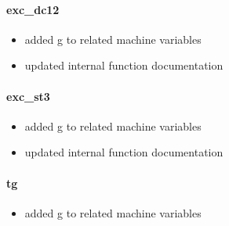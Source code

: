 \documentclass[12pt]{article}
\begin{document}
\paragraph{exc\_dc12}
	\begin{itemize}
		\item added g to related machine variables
		\item updated internal function documentation
	\end{itemize}
\paragraph{exc\_st3}
	\begin{itemize}
		\item added g to related machine variables
		\item updated internal function documentation
	\end{itemize}
\paragraph{tg}
	\begin{itemize}
		\item added g to related machine variables
	\end{itemize}
\end{document}
